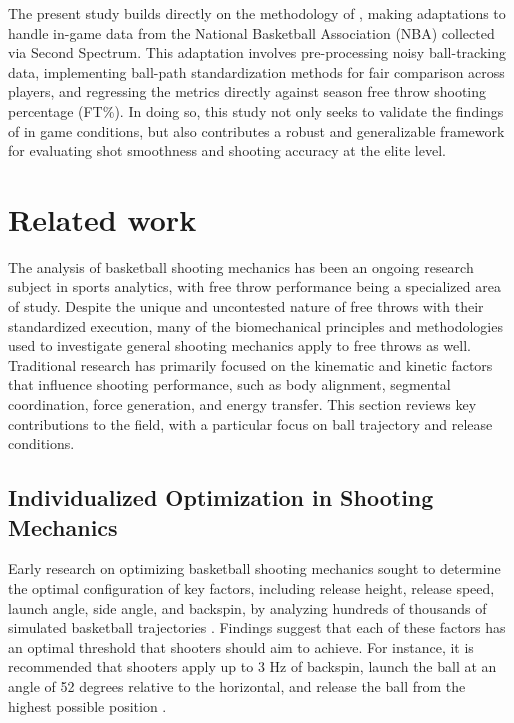 \documentclass{article}
\begin{document}
    The present study builds directly on the methodology of \citet{slegers_role_2024}, making adaptations to handle in-game data from the National Basketball Association (NBA) collected via Second Spectrum. This adaptation involves pre-processing noisy ball-tracking data, implementing ball-path standardization methods for fair comparison across players, and regressing the metrics directly against season free throw shooting percentage (FT\%). In doing so, this study not only seeks to validate the findings of \citet{slegers_role_2024} in game conditions, but also contributes a robust and generalizable framework for evaluating shot smoothness and shooting accuracy at the elite level.

  \section{Related work}
  
    The analysis of basketball shooting mechanics has been an ongoing research subject in sports analytics, with free throw performance being a specialized area of study. Despite the unique and uncontested nature of free throws with their standardized execution, many of the biomechanical principles and methodologies used to investigate general shooting mechanics apply to free throws as well. Traditional research has primarily focused on the kinematic and kinetic factors that influence shooting performance, such as body alignment, segmental coordination, force generation, and energy transfer. This section reviews key contributions to the field, with a particular focus on ball trajectory and release conditions.

    \subsection{Individualized Optimization in Shooting Mechanics}

      Early research on optimizing basketball shooting mechanics sought to determine the optimal configuration of key factors, including release height, release speed, launch angle, side angle, and backspin, by analyzing hundreds of thousands of simulated basketball trajectories \citep{tran_optimal_2008}. Findings suggest that each of these factors has an optimal threshold that shooters should aim to achieve. For instance, it is recommended that shooters apply up to 3 Hz of backspin, launch the ball at an angle of 52 degrees relative to the horizontal, and release the ball from the highest possible position \citep{tran_optimal_2008}.
\end{document}
